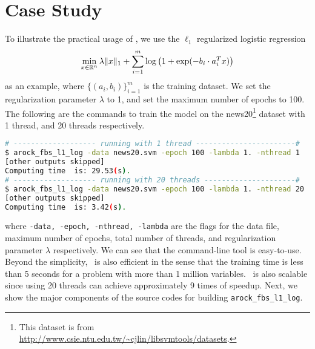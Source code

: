 \section{Case Study}\label{sec:quick_start}
To illustrate the practical usage of \pkg, we use the $\ell_1$ regularized logistic regression
\begin{equation}\label{eq:l1_log}
\min_{x \in \mathbb{R}^n} \lambda \|x\|_1 + \sum_{i = 1}^m \log\left(1 + \exp(-b_i \cdot a_i^T x)\right)
\end{equation}
as an example, where $\{(a_i, b_i)\}_{i = 1}^m$ is the training dataset. We set the regularization parameter $\lambda$ to 1, and set the maximum number of epochs to 100. The following are the commands to train the model on the news20\footnote{ This dataset is from \url{http://www.csie.ntu.edu.tw/~cjlin/libsvmtools/datasets}.} dataset with 1 thread, and 20 threads respectively.
\begin{lstlisting}[language=bash]
# ------------------- running with 1 thread -----------------------#
$ arock_fbs_l1_log -data news20.svm -epoch 100 -lambda 1. -nthread 1 
[other outputs skipped]
Computing time  is: 29.53(s).
# ------------------- running with 20 threads ---------------------#
$ arock_fbs_l1_log -data news20.svm -epoch 100 -lambda 1. -nthread 20 
[other outputs skipped]
Computing time  is: 3.42(s).
\end{lstlisting}
where \texttt{-data, -epoch, -nthread, -lambda} are the flags for the data file, maximum number of epochs, total number of threads, and regularization parameter $\lambda$ respectively. We can see that the command-line tool is easy-to-use. Beyond the simplicity, \pkg~is also efficient in the sense that the training time is less than 5 seconds for a problem with more than 1 million variables. \pkg~is also scalable since using 20 threads can achieve approximately 9 times of speedup. Next, we show the major components of the source codes for building \texttt{arock\_fbs\_l1\_log}.

